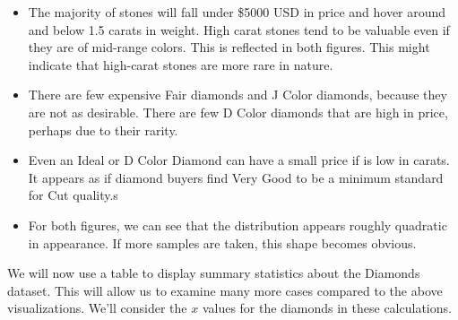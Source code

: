 \documentclass[
]{article}
\begin{document}
\begin{itemize}
\item
  The majority of stones will fall under \$5000 USD in price and hover
  around and below 1.5 carats in weight. High carat stones tend to be
  valuable even if they are of mid-range colors. This is reflected in
  both figures. This might indicate that high-carat stones are more rare
  in nature.
\item
  There are few expensive Fair diamonds and J Color diamonds, because
  they are not as desirable. There are few D Color diamonds that are
  high in price, perhaps due to their rarity.
\item
  Even an Ideal or D Color Diamond can have a small price if is low in
  carats. It appears as if diamond buyers find Very Good to be a minimum
  standard for Cut quality.s
\item
  For both figures, we can see that the distribution appears roughly
  quadratic in appearance. If more samples are taken, this shape becomes
  obvious.
\end{itemize}

We will now use a table to display summary statistics about the Diamonds
dataset. This will allow us to examine many more cases compared to the
above visualizations. We'll consider the \(x\) values for the diamonds
in these calculations.
\end{document}
